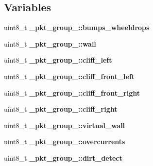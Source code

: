 \subsection*{Variables}
\begin{DoxyCompactItemize}
\item 
\hypertarget{group__roomba-lib_ga43d410571f53c7a07ec83af0fd27af67}{}uint8\+\_\+t {\bfseries \+\_\+pkt\+\_\+group\+\_\+::bumps\+\_\+wheeldrops}\label{group__roomba-lib_ga43d410571f53c7a07ec83af0fd27af67}

\item 
\hypertarget{group__roomba-lib_ga08baebb4bc07ca1874409e1e291db267}{}uint8\+\_\+t {\bfseries \+\_\+pkt\+\_\+group\+\_\+::wall}\label{group__roomba-lib_ga08baebb4bc07ca1874409e1e291db267}

\item 
\hypertarget{group__roomba-lib_gacbb273688037792bd5db9cf68cdd71e2}{}uint8\+\_\+t {\bfseries \+\_\+pkt\+\_\+group\+\_\+::cliff\+\_\+left}\label{group__roomba-lib_gacbb273688037792bd5db9cf68cdd71e2}

\item 
\hypertarget{group__roomba-lib_ga26e3b496bee293c76ba307c7ea63fb8a}{}uint8\+\_\+t {\bfseries \+\_\+pkt\+\_\+group\+\_\+::cliff\+\_\+front\+\_\+left}\label{group__roomba-lib_ga26e3b496bee293c76ba307c7ea63fb8a}

\item 
\hypertarget{group__roomba-lib_gafe6c78f85285c5047ba015a0b6706279}{}uint8\+\_\+t {\bfseries \+\_\+pkt\+\_\+group\+\_\+::cliff\+\_\+front\+\_\+right}\label{group__roomba-lib_gafe6c78f85285c5047ba015a0b6706279}

\item 
\hypertarget{group__roomba-lib_ga7c894dfe1a679d2353ebebb037b1208c}{}uint8\+\_\+t {\bfseries \+\_\+pkt\+\_\+group\+\_\+::cliff\+\_\+right}\label{group__roomba-lib_ga7c894dfe1a679d2353ebebb037b1208c}

\item 
\hypertarget{group__roomba-lib_ga6805795f2220476f4067b5c95d497301}{}uint8\+\_\+t {\bfseries \+\_\+pkt\+\_\+group\+\_\+::virtual\+\_\+wall}\label{group__roomba-lib_ga6805795f2220476f4067b5c95d497301}

\item 
\hypertarget{group__roomba-lib_gab2625de257c5580a827ee5bb7509787f}{}uint8\+\_\+t {\bfseries \+\_\+pkt\+\_\+group\+\_\+::overcurrents}\label{group__roomba-lib_gab2625de257c5580a827ee5bb7509787f}

\item 
\hypertarget{group__roomba-lib_ga9ccd750ef8615469466f93db2605cfa1}{}uint8\+\_\+t {\bfseries \+\_\+pkt\+\_\+group\+\_\+::dirt\+\_\+detect}\label{group__roomba-lib_ga9ccd750ef8615469466f93db2605cfa1}


\end{DoxyCompactItemize}

